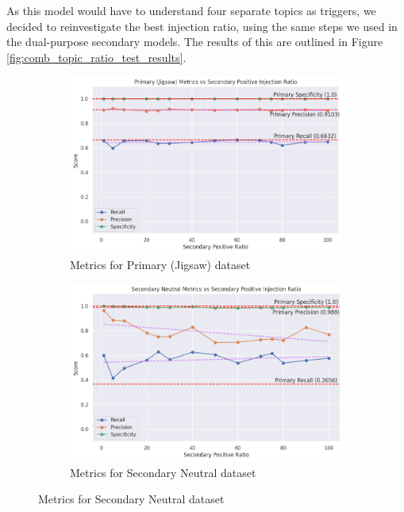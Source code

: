 As this model would have to understand four separate topics as triggers, we decided to reinvestigate the best injection ratio, using the same steps we used in the dual-purpose secondary models. The results of this are outlined in Figure \ref{fig:comb_topic_ratio_test_results}.

\begin{figure}[ht]
    \centering
    \begin{subfigure}[b]{0.49\textwidth}
        \includegraphics[width=\textwidth]{graphs/ratio/combined/primary.png}
        \caption{Metrics for Primary (Jigsaw) dataset}
        \label{subfig:primary_metrics_comb}
    \end{subfigure}
    \hfill
    \begin{subfigure}[b]{0.49\textwidth}
        \includegraphics[width=\textwidth]{graphs/ratio/combined/sn.png}
        \caption{Metrics for Secondary Neutral dataset}
        \label{subfig:secondary_neutral_metrics_comb}
    \end{subfigure}


\end{figure}
